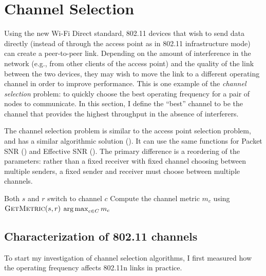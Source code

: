 \section{Channel Selection}\label{sec:esnr_chansel}
Using the new Wi-Fi Direct standard, 802.11 devices that wish to send data directly (instead of through the access point as in 802.11 infrastructure mode) can create a peer-to-peer link. Depending on the amount of interference in the network (e.g., from other clients of the access point) and the quality of the link between the two devices, they may wish to move the link to a different operating channel in order to improve performance. This is one example of the \emph{channel selection} problem: to quickly choose the best operating frequency for a pair of nodes to communicate. In this section, I define the ``best'' channel to be the channel that provides the highest throughput in the absence of interferers.

The channel selection problem is similar to the access point selection problem, and has a similar algorithmic solution (). It can use the same  functions for Packet SNR () and Effective SNR (). The primary difference is a reordering of the parameters: rather than a fixed receiver with fixed channel choosing between multiple senders, a fixed sender and receiver must choose between multiple channels.

\begin{algorithm}[thp]
\caption{\label{alg:chan_sel_basic}}
\begin{algorithmic}[1]
\STATE Both $s$ and $r$ switch to channel $c$
\STATE Compute the channel metric $m_c$ using $\textsc{GetMetric}(s,r)$
\ENDFOR
\RETURN $\operatorname*{arg\,max}_{c\in C} m_c$ \hfill {}
\end{algorithmic}
\end{algorithm}

\subsection{Characterization of 802.11 channels}
To start my investigation of channel selection algorithms, I first measured how the operating frequency affects 802.11n links in practice.

